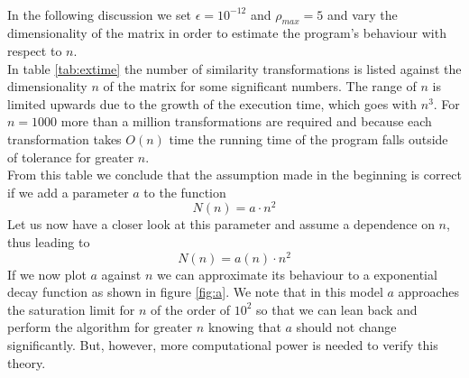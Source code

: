 \documentclass[11pt,a4wide]{article}
\begin{document}
\\
In the following discussion we set $\epsilon=10^{-12}$ and $\rho_ {max}=5$ and vary the dimensionality of the matrix in order to estimate the program's behaviour with respect to $n$.
\\
In table \ref{tab:extime} the number of similarity transformations is listed against the dimensionality $n$ of the matrix for some significant numbers. The range of $n$ is limited upwards due to the growth of the execution time, which goes with $n^3$. For $n=1000$ more than a million transformations are required and because each transformation takes $O(n)$ time the running time of the program falls outside of tolerance for greater $n$.
\\
From this table we conclude that the assumption made in the beginning is correct if we add a parameter $a$ to the function 
\begin{equation}
N(n)=a\cdot n^2
\label{eq:behofn}
\end{equation}
Let us now have a closer look at this parameter and assume a dependence on $n$, thus leading to
\begin{equation}
N(n)=a(n)\cdot n^2
\label{eq:a(n)}
\end{equation}
If we now plot $a$ against $n$ we can approximate its behaviour to a exponential decay function as shown in figure \ref{fig:a}. We note that in this model $a$ approaches the saturation limit for $n$ of the order of $10^2$ so that we can lean back and perform the algorithm for greater $n$ knowing that $a$ should not change significantly. But, however, more computational power is needed to verify this theory.
\end{document}
